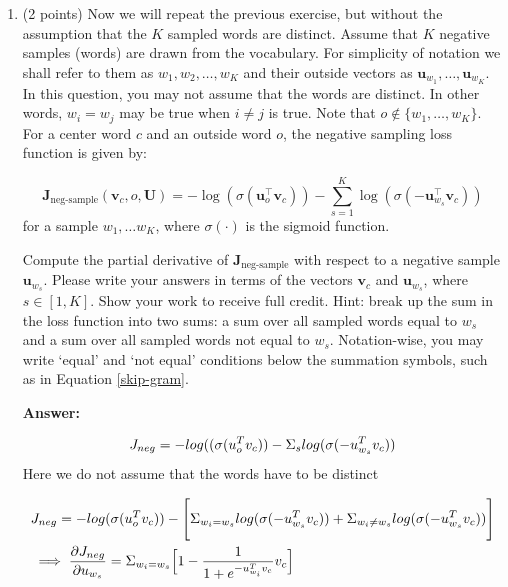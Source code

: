 \documentclass{article}
\newenvironment{answer}{
    {\bf Answer:} \sf \begingroup\color{black}
}{\endgroup}%
\begin{document}
\begin{enumerate}[label=(\alph*)]
\begin{shaded}
\begin{answer}
\end{answer}
\end{shaded}

\item (2 points) Now we will repeat the previous exercise, but without the assumption that the $K$ sampled words are distinct.  Assume that $K$ negative samples (words) are drawn from the vocabulary. For simplicity of notation we shall refer to them as $w_1, w_2, \dots, w_K$ and their outside vectors as $\bm u_{w_1}, \dots, \bm u_{w_K}$. In this question, you may not assume that the words are distinct. In other words, $w_i=w_j$ may be true when $i\neq j$ is true.
Note that $o\notin\{w_1, \dots, w_K\}$. 
For a center word $c$ and an outside word $o$, the negative sampling loss function is given by:

\begin{equation}
\bm J_{\text{neg-sample}}(\bm v_c, o, \bm U) = -\log(\sigma(\bm u_o^\top \bm v_c)) - \sum_{s=1}^K \log(\sigma(-\bm u_{w_s}^\top \bm v_c))
\end{equation}
for a sample $w_1, \ldots w_K$, where $\sigma(\cdot)$ is the sigmoid function.

Compute the partial derivative of $\bm J_{\text{neg-sample}}$ with respect to a negative sample $\bm u_{w_s}$. Please write your answers in terms of the vectors $\bm v_c$ and $\bm u_{w_s}$, where $s \in [1, K]$. Show your work to receive full credit. Hint: break up the sum in the loss function into two sums: a sum over all sampled words equal to $w_s$ and a sum over all sampled words not equal to $w_s$. Notation-wise, you may write `equal' and `not equal' conditions below the summation symbols, such as in Equation \ref{skip-gram}.

\begin{shaded}
\begin{answer}

\begin{equation}
    J_{neg} = -log((\sigma(u_o^T v_c)) - \Sigma_s log(\sigma(-u_{w_s}^T v_c)) \\    
\end{equation}
Here we do not assume that the words have to be distinct

\begin{equation}
    \begin{split}
        & J_{neg} = -log(\sigma(u_o^Tv_c)) - \Biggl[
            \Sigma_{w_i = w_s} log(\sigma(-u_{w_s}^T v_c)) + \Sigma_{w_i \neq w_s} log(\sigma(-u_{w_s}^T v_c))
        \Biggl] \\
        &\implies\frac{\partial J_{neg}}{\partial u_{w_s}} = \Sigma_{w_i = w_s} \Bigl[ 1 - \frac{1}{1+e^{-u_{w_i}^T v_c}} v_c \Bigl]
    \end{split}
\end{equation}


\end{answer}
\end{shaded}
\end{enumerate}
\end{document}
